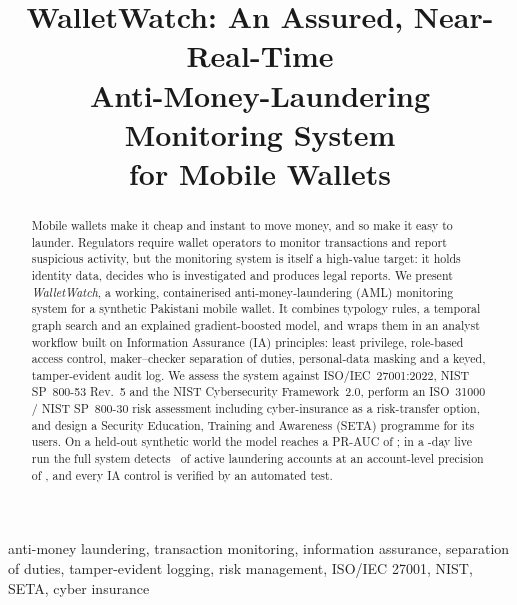 \documentclass[conference,10pt]{IEEEtran}
\begin{document}
\title{WalletWatch: An Assured, Near-Real-Time\\Anti-Money-Laundering Monitoring System\\for Mobile Wallets}

\author{
}

\maketitle

\begin{abstract}
Mobile wallets make it cheap and instant to move money, and so make it easy to launder.
Regulators require wallet operators to monitor transactions and report suspicious activity, but
the monitoring system is itself a high-value target: it holds identity data, decides who is
investigated and produces legal reports. We present \emph{WalletWatch}, a working, containerised
anti-money-laundering (AML) monitoring system for a synthetic Pakistani mobile wallet. It
combines typology rules, a temporal graph search and an explained gradient-boosted model, and wraps
them in an analyst workflow built on Information Assurance (IA) principles: least privilege,
role-based access control, maker--checker separation of duties, personal-data masking and a
keyed, tamper-evident audit log. We assess the system against ISO/IEC~27001:2022, NIST SP~800-53
Rev.~5 and the NIST Cybersecurity Framework~2.0, perform an ISO~31000 / NIST SP~800-30 risk
assessment including cyber-insurance as a risk-transfer option, and design a Security Education,
Training and Awareness (SETA) programme for its users. On a held-out synthetic world the model
reaches a PR-AUC of \ResMLPRAUC; in a \ResDays-day live run the full system detects
\ResRecallPct\ of active laundering accounts at an account-level precision of \ResPrecisionPct,
and every IA control is verified by an automated test.
\end{abstract}

\begin{IEEEkeywords}
anti-money laundering, transaction monitoring, information assurance, separation of duties,
tamper-evident logging, risk management, ISO/IEC 27001, NIST, SETA, cyber insurance
\end{IEEEkeywords}
\end{document}
